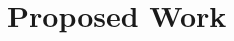 \documentclass[a4paper]{scrartcl}
\begin{document}
\section*{Proposed Work}
\label{sec:proposed_work}


%
%
\end{document}
